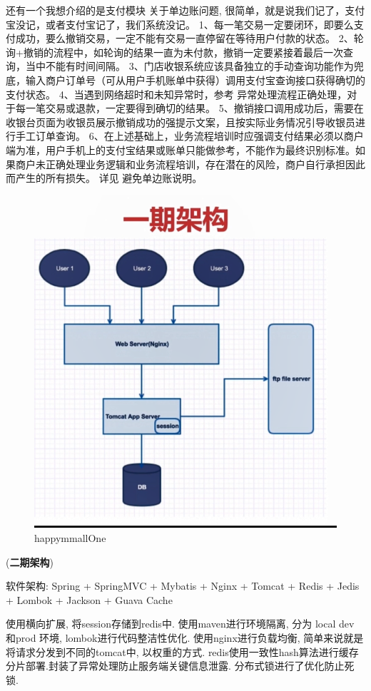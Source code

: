 还有一个我想介绍的是支付模块
关于单边账问题, 很简单，就是说我们记了，支付宝没记，或者支付宝记了，我们系统没记。
1、每一笔交易一定要闭环，即要么支付成功，要么撤销交易，一定不能有交易一直停留在等待用户付款的状态。
2、轮询+撤销的流程中，如轮询的结果一直为未付款，撤销一定要紧接着最后一次查询，当中不能有时间间隔。
3、门店收银系统应该具备独立的手动查询功能作为兜底，输入商户订单号（可从用户手机账单中获得）调用支付宝查询接口获得确切的支付状态。
4、当遇到网络超时和未知异常时，参考 异常处理流程正确处理，对于每一笔交易或退款，一定要得到确切的结果。
5、撤销接口调用成功后，需要在收银台页面为收银员展示撤销成功的强提示文案，且按实际业务情况引导收银员进行手工订单查询。
6、在上述基础上，业务流程培训时应强调支付结果必须以商户端为准，用户手机上的支付宝结果或账单只能做参考，不能作为最终识别标准。如果商户未正确处理业务逻辑和业务流程培训，存在潜在的风险，商户自行承担因此而产生的所有损失。
详见 避免单边账说明。



\begin{figure}
	\centering
	\includegraphics[width=0.7\linewidth]{figures/happymmallOne.png}
	\caption{happymmallOne}
	\label{fig:happymmallOne}
\end{figure}

(\textbf{二期架构})

软件架构: Spring + SpringMVC + Mybatis + Nginx + Tomcat + Redis + Jedis + Lombok + Jackson + Guava Cache

使用横向扩展, 将session存储到redis中. 使用maven进行环境隔离, 分为 local dev 和prod 环境, lombok进行代码整洁性优化. 使用nginx进行负载均衡, 简单来说就是将请求分发到不同的tomcat中, 以权重的方式. redis使用一致性hash算法进行缓存分片部署.封装了异常处理防止服务端关键信息泄露. 分布式锁进行了优化防止死锁.




